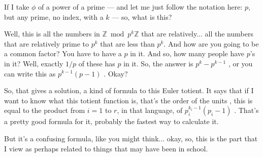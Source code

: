 \begin{content}
\end{content}

\begin{speech}[00:19:16 - 00:20:45]
If I take $\phi$ of a power of a prime  --- and let me just follow the notation here: $p$, but any prime, no index, with a $k$ --- so, what is this?

Well, this is all the numbers in $\mathbb{Z} \bmod p^k \mathbb{Z}$ that are relatively... all the numbers that are relatively prime to $p^k$ that are less than $p^k$. And how are you going to be a common factor? You have to have a $p$ in it. And so, how many people have $p$'s in it? Well, exactly $1/p$ of these has $p$ in it. So, the answer is $p^k - p^{k-1}$ , or you can write this as $p^{k-1}(p - 1)$ . Okay?

So, that gives a solution, a kind of formula to this Euler totient. It says that if I want to know what this totient function is, that's the order of the units , this is equal to the product from $i = 1$ to $r$, in that language, of $p_i^{k_i - 1}(p_i - 1)$ . That's a pretty good formula for it, probably the fastest way to calculate it.

But it's a confusing formula, like you might think... okay, so, this is the part that I view as perhaps related to things that may have been in school.
\end{speech}

